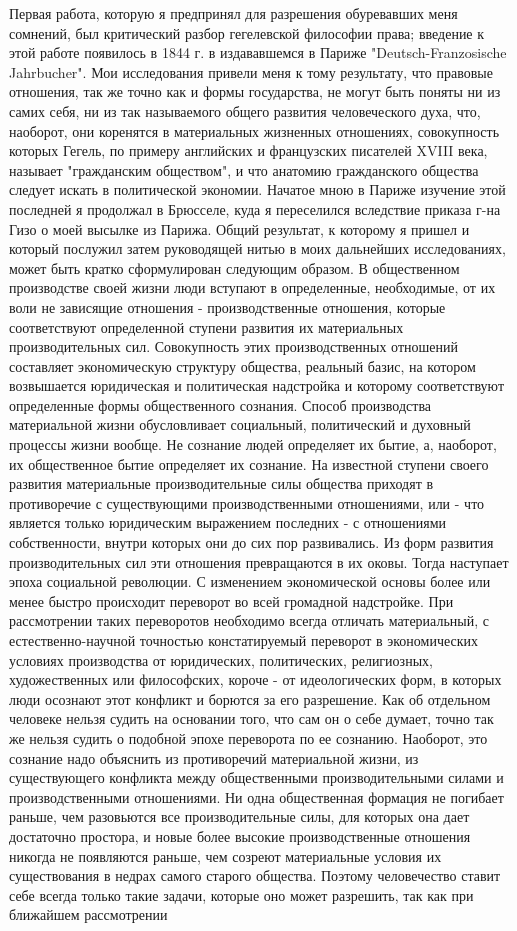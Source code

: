 \documentclass[12pt]{article}
\newcommand{\parnum}{(\arabic{parcount})}
\newcounter{parcount}
\newenvironment{parnumbers}{%
  \par%
  \everypar{\noindent \stepcounter{parcount}\marginpar[]{\parnum}}%
}{}
\begin{document}
\begin{parnumbers}
    Первая работа, которую я предпринял для разрешения обуревавших меня сомнений, был критический разбор гегелевской философии права; введение к этой работе появилось в 1844 г. в издававшемся в Париже "Deutsch-Franzosische Jahrbucher". Мои исследования привели меня к тому результату, что правовые отношения, так же точно как и формы государства, не могут быть поняты ни из самих себя, ни из так называемого общего развития человеческого духа, что, наоборот, они коренятся в материальных жизненных отношениях, совокупность которых Гегель, по примеру английских и французских писателей XVIII века, называет "гражданским обществом", и что анатомию гражданского общества следует искать в политической экономии. Начатое мною в Париже изучение этой последней я продолжал в Брюсселе, куда я переселился вследствие приказа г-на Гизо о моей высылке из Парижа. Общий результат, к которому я пришел и который послужил затем руководящей нитью в моих дальнейших исследованиях, может быть кратко сформулирован следующим образом. В общественном производстве своей жизни люди вступают в определенные, необходимые, от их воли не зависящие отношения - производственные отношения, которые соответствуют определенной ступени развития их материальных производительных сил. Совокупность этих производственных отношений составляет экономическую структуру общества, реальный базис, на котором возвышается юридическая и политическая надстройка и которому соответствуют определенные формы общественного сознания. Способ производства материальной жизни обусловливает социальный, политический и духовный процессы жизни вообще. Не сознание людей определяет их бытие, а, наоборот, их общественное бытие определяет их сознание. На известной ступени своего развития материальные производительные силы общества приходят в противоречие с существующими производственными отношениями, или - что является только юридическим выражением последних - с отношениями собственности, внутри которых они до сих пор развивались. Из форм развития производительных сил эти отношения превращаются в их оковы. Тогда наступает эпоха социальной революции. С изменением экономической основы более или менее быстро происходит переворот во всей громадной надстройке. При рассмотрении таких переворотов необходимо всегда отличать материальный, с естественно-научной точностью констатируемый переворот в экономических условиях производства от юридических, политических, религиозных, художественных или философских, короче - от идеологических форм, в которых люди осознают этот конфликт и борются за его разрешение. Как об отдельном человеке нельзя судить на основании того, что сам он о себе думает, точно так же нельзя судить о подобной эпохе переворота по ее сознанию. Наоборот, это сознание надо объяснить из противоречий материальной жизни, из существующего конфликта между общественными производительными силами и производственными отношениями. Ни одна общественная формация не погибает раньше, чем разовьются все производительные силы, для которых она дает достаточно простора, и новые более высокие производственные отношения никогда не появляются раньше, чем созреют материальные условия их существования в недрах самого старого общества. Поэтому человечество ставит себе всегда только такие задачи, которые оно может разрешить, так как при ближайшем рассмотрении 
\end{parnumbers}
\end{document}
